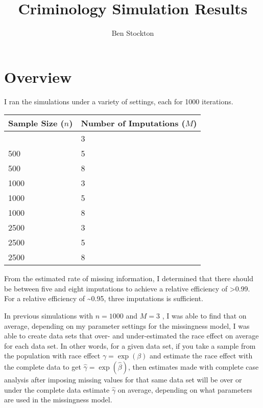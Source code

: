\documentclass[
  letterpaper,
  DIV=11,
  numbers=noendperiod]{scrartcl}
\title{Criminology Simulation Results}
\author{Ben Stockton}
\date{}
\renewcommand*\contentsname{Table of contents}
\newcommand\contentsname{Table of contents}
\begin{document}
\maketitle
\ifdefined\Shaded\renewenvironment{Shaded}{\begin{tcolorbox}[frame hidden, enhanced, boxrule=0pt, breakable, interior hidden, sharp corners, borderline west={3pt}{0pt}{shadecolor}]}{\end{tcolorbox}}\fi

\renewcommand*\contentsname{Table of contents}
{
\hypersetup{linkcolor=}
\setcounter{tocdepth}{3}
\tableofcontents
}
\hypertarget{overview}{%
\section{Overview}\label{overview}}

I ran the simulations under a variety of settings, each for 1000
iterations.

\begin{longtable}[]{@{}ll@{}}
\toprule\noalign{}
Sample Size (\(n\)) & Number of Imputations (\(M\)) \\
\midrule\noalign{}
\endhead
\bottomrule\noalign{}
\endlastfoot
500 & 3 \\
500 & 5 \\
500 & 8 \\
1000 & 3 \\
1000 & 5 \\
1000 & 8 \\
2500 & 3 \\
2500 & 5 \\
2500 & 8 \\
\end{longtable}

From the estimated rate of missing information, I determined that there
should be between five and eight imputations to achieve a relative
efficiency of \textgreater0.99. For a relative efficiency of
\textasciitilde0.95, three imputations is sufficient.

In previous simulations with \(n = 1000\) and \(M = 3\) , I was able to
find that on average, depending on my parameter settings for the
missingness model, I was able to create data sets that over- and
under-estimated the race effect on average for each data set. In other
words, for a given data set, if you take a sample from the population
with race effect \(\gamma = \exp(\beta)\) and estimate the race effect
with the complete data to get \(\hat{\gamma} = \exp(\hat{\beta})\), then
estimates made with complete case analysis after imposing missing values
for that same data set will be over or under the complete data estimate
\(\hat{\gamma}\) on average, depending on what parameters are used in
the missingness model.
\end{document}
